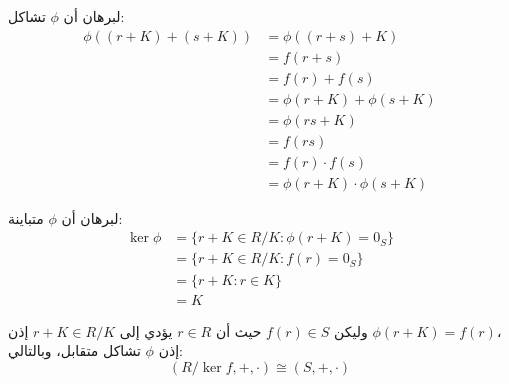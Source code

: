 لبرهان أن $\phi$ تشاكل:
\begin{align*}
	\phi((r + K) + (s + K)) &= \phi((r + s) + K)\\
	&= f(r + s)\\
	&= f(r) + f(s)\\
	&= \phi(r + K) + \phi(s + K)\\
   &= \phi(rs + K)\\
	&= f(rs)\\
	&= f(r) \cdot f(s)\\
	&= \phi(r + K) \cdot \phi(s + K)
\end{align*}

لبرهان أن $\phi$ متباينة:
\begin{align*}
	\ker \phi &= \{r + K \in R/K : \phi(r + K) = 0_S\}\\
	&= \{r + K \in R/K : f(r) = 0_S\}\\
	&= \{r + K : r \in K\}\\
	&= K
\end{align*}

وليكن $f(r) \in S$ حيث أن $r \in R$ يؤدي إلى $r + K \in R/K$ إذن 
$\phi(r + K) = f(r)$،\\
إذن $\phi$ تشاكل متقابل، وبالتالي:
\[
(R/\ker f, +, \cdot) \cong (S, +, \cdot)
\]


